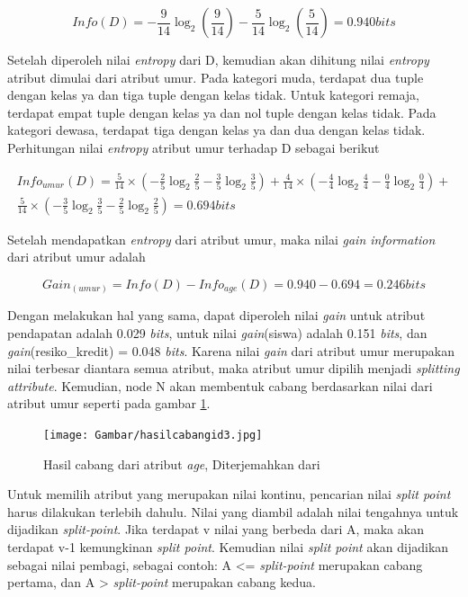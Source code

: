 \begin{displaymath}
	Info(D) = - \frac{9}{14}\log_2(\frac{9}{14}) - \frac{5}{14}\log_2(\frac{5}{14}) = 0.940 bits
\end{displaymath}

Setelah diperoleh nilai \textsl{entropy} dari D, kemudian akan dihitung nilai \textsl{entropy} atribut dimulai dari atribut umur. Pada kategori muda, terdapat dua tuple dengan kelas ya dan tiga tuple dengan kelas tidak. Untuk kategori remaja, terdapat empat tuple dengan kelas ya dan nol tuple dengan kelas tidak. Pada kategori dewasa, terdapat tiga dengan kelas ya dan dua dengan kelas tidak. Perhitungan nilai \textsl{entropy} atribut umur terhadap D sebagai berikut

\begin{align*}
	Info_{umur}(D) = \frac{5}{14} \times (-\frac{2}{5}\log_2\frac{2}{5} - \frac{3}{5}\log_2\frac{3}{5}) + \frac{4}{14} \times (-\frac{4}{4}\log_2\frac{4}{4} - \frac{0}{4}\log_2\frac{0}{4}) + \\
	\frac{5}{14} \times (-\frac{3}{5}\log_2\frac{3}{5} - \frac{2}{5}\log_2\frac{2}{5}) = 0.694 bits
\end{align*}

Setelah mendapatkan \textsl{entropy} dari atribut umur, maka nilai \textsl{gain information} dari atribut umur adalah

\begin{displaymath}
	Gain_{(umur)} = Info(D) - Info_{age}(D) = 0.940 - 0.694 = 0.246 bits
\end{displaymath}

Dengan melakukan hal yang sama, dapat diperoleh nilai \textsl{gain} untuk atribut pendapatan adalah 0.029 \textsl{bits}, untuk nilai \textsl{gain}(siswa) adalah 0.151 \textsl{bits}, dan \textsl{gain}(resiko\_kredit) = 0.048 \textsl{bits}. Karena nilai \textsl{gain} dari atribut umur merupakan nilai terbesar diantara semua atribut, maka atribut umur dipilih menjadi \textsl{splitting attribute}. Kemudian, node N akan membentuk cabang berdasarkan nilai dari atribut umur seperti pada gambar \ref{fig:hasilCabang}.

\begin{figure}
\centering
\texttt{[image: Gambar/hasilcabangid3.jpg]}
\caption[Hasil pohon faktor pada atribut \textsl{age} dari table 2.1]{Hasil cabang dari atribut \textsl{age}, Diterjemahkan dari \cite{DM}} 
\label{fig:hasilCabang}
\end{figure}

Untuk memilih atribut yang merupakan nilai kontinu, pencarian nilai \textsl{split point} harus dilakukan terlebih dahulu. Nilai yang diambil adalah nilai tengahnya untuk dijadikan \textsl{split-point}. Jika terdapat v nilai yang berbeda dari A, maka akan terdapat v-1 kemungkinan \textsl{split point}. Kemudian nilai \textsl{split point} akan dijadikan sebagai nilai pembagi, sebagai contoh: A <= \textsl{split-point} merupakan cabang pertama, dan A > \textsl{split-point} merupakan cabang kedua.

